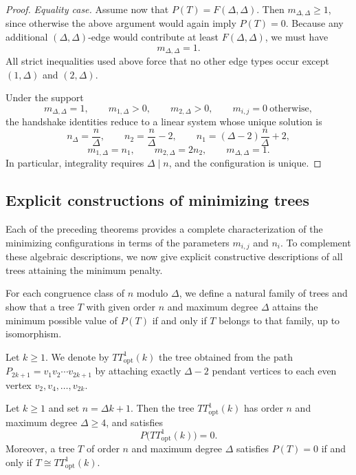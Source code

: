\documentclass[preprint,12pt]{elsarticle}
\begin{document}
\begin{proof}
\medskip
\noindent\emph{Equality case.}
Assume now that $P(T)=F(\Delta,\Delta)$.
Then $m_{\Delta,\Delta}\ge 1$, since otherwise the above argument would again
imply $P(T)=0$.
Because any additional $(\Delta,\Delta)$-edge would contribute at least
$F(\Delta,\Delta)$, we must have
\[
m_{\Delta,\Delta}=1.
\]
All strict inequalities used above force that no other edge types occur except
$(1,\Delta)$ and $(2,\Delta)$.

Under the support
\[
m_{\Delta,\Delta}=1,\qquad
m_{1,\Delta}>0,\qquad
m_{2,\Delta}>0,\qquad
m_{i,j}=0\ \text{otherwise},
\]
the handshake identities reduce to a linear system whose unique solution is
\[
n_\Delta=\frac{n}{\Delta},\qquad
n_2=\frac{n}{\Delta}-2,\qquad
n_1=(\Delta-2)\frac{n}{\Delta}+2,
\]
\[
m_{1,\Delta}=n_1,\qquad
m_{2,\Delta}=2n_2,\qquad
m_{\Delta,\Delta}=1.
\]
In particular, integrality requires $\Delta\mid n$, and the configuration is unique.
\end{proof}




\subsection{Explicit constructions of minimizing trees}


\medskip

Each of the preceding theorems provides a complete characterization of the
minimizing configurations in terms of the parameters $m_{i,j}$ and $n_i$.
To complement these algebraic descriptions, we now give explicit constructive
descriptions of all trees attaining the minimum penalty.

For each congruence class of $n$ modulo $\Delta$, we define a natural family of
trees and show that a tree $T$ with given order $n$ and maximum degree $\Delta$
attains the minimum possible value of $P(T)$ if and only if $T$ belongs to that
family, up to isomorphism.

\medskip


Let $k\ge 1$.
We denote by $TT^1_{\mathrm{opt}}(k)$ the tree obtained from the path
$P_{2k+1}=v_1v_2\cdots v_{2k+1}$ by attaching exactly $\Delta-2$ pendant vertices
to each even vertex $v_2,v_4,\dots,v_{2k}$.


\begin{lemma}
\label{lem:TT1opt}
Let $k\ge 1$ and set $n=\Delta k+1$.
Then the tree $TT^1_{\mathrm{opt}}(k)$ has order $n$ and maximum degree $\Delta\ge4$,
and satisfies
\[
P\bigl(TT^1_{\mathrm{opt}}(k)\bigr)=0.
\]
Moreover, a tree $T$ of order $n$ and maximum degree $\Delta$ satisfies $P(T)=0$
if and only if $T\cong TT^1_{\mathrm{opt}}(k)$.
\end{lemma}
\end{document}
